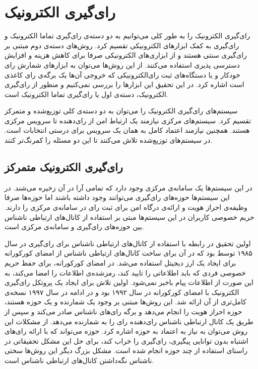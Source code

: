 \section{رای‌گیری الکترونیک}
رای‌گیری الکترونیک را به طور کلی می‌توانیم به دو دسته‌ی رای‌گیری تماما الکترونیک و رای‌گیری به کمک ابزار‌های الکترونیکی تقسیم کرد. روش‌های دسته‌ی دوم مبتنی بر رای‌گیری سنتی هستند و از ابزاری‌های الکترونیکی صرفا برای کاهش هزینه و افزایش دسترسی پذیری استفاده می‌کنند. از این روش‌ها می‌توان به ابزارهای شمارش رای خودکار و یا دستگاه‌های ثبت رای‌الکترونیکی که خروجی آن‌ها یک برگه‌ی رای‌ کاغذی
است اشاره کرد. در این تحقیق این ابزارها را بررسی نمی‌کنیم و منظور از رای‌گیری الکترونیک، دسته‌ی اول یا رای‌گیری تماما الکترونیک است.
\par
سیستم‌های رای‌گیری الکترونیک را می‌توان به دو دسته‌ی کلی توزیع‌شده و متمرکز تقسیم کرد. سیستم‌های مرکزی نیازمند یک ارتباط امن از رای‌دهنده تا سرویس مرکزی هستند. همچنین نیازمند اعتماد کامل به همان یک سرویس برای درستی انتخابات است. در سیستم‌های توزیع‌شده تلاش می‌کنند تا این دو مسئله را کمرنگ‌تر کنند.

\subsection{رای‌گیری الکترونیک متمرکز}
در این سیستم‌ها یک سامانه‌ی مرکزی وجود دارد که تمامی آرا در آن زخیره می‌شند. در این سیستم‌ها حوزه‌های رای‌گیری می‌توانند وجود داشته باشند اما حوزه‌ها صرفا وظیفه‌ی احراز هویت و ارائه‌ی درگاه امن برای ثبت رای در سامانه‌ی مرکزی را دارند. حریم خصوصی کاربران در این سیستم‌ها مبتی بر استفاده از کانال‌های ارتباطی ناشناس 
بین حوزه‌های رای‌گیری و سامانه‌ی مرکزی است.
\par
اولین تحقیق در رابطه با استفاده‌ از کانال‌های ارتباطی ناشناس برای رای‌گیری در سال ۱۹۸۵ توسط 
\cite{Chaum}
بود که در آن برای ساخت‌ کانال‌های ارتباطی ناشناس از امضای کورکورانه 
\cite{blindsig}
برای ایجاد یک ارز دیجیتل استفاده می‌شد. در امضای کورکورانه، برای حفظ حریم خصوصی فردی که باید اطلاعاتی را تایید کند، رمزشده‌ی اطلاعات را امضا می‌کند، به این صورت از اطلاعات پیام باخبر نمی‌شود. اولین تلاش برای ایجاد یک پروتکل رای‌گیری الکترونیک با امضای کورکورانه در سال ۱۹۹۲ 
\cite{foo92}
بود و در ادامه در سال ۱۹۹۷
\cite{improveblind}
نسخه‌ی کامل‌تری از آن ارائه شد. این روش‌ها مبتنی بر وجود یک شمارنده و یک حوزه هستند، حوزه احراز هویت را انجام می‌دهد و برگه‌ رای‌های ناشناس صادر می‌کند و سپس از طریق یک کانال ارتباطی ناشناس رای‌دهنده رای را به شمارنده می‌دهد. از مشکلات این روش می‌توان به نیاز به اعتماد به حوزه اشاره کرد. حوزه می‌تواند که با ارائه رای‌های اشتباه بدون توانایی پیگیری، رای‌گیری را خراب کند، برای حل این مشکل تحقیقاتی
\cite{multiteller}
در راستای استفاده از چند حوزه انجام شده است. مشکل بزرگ دیگر این روش‌ها
\cite{anonchan}
سختی ناشناس نگه‌داشتن کانال‌های ارتباطی ناشناس است.

